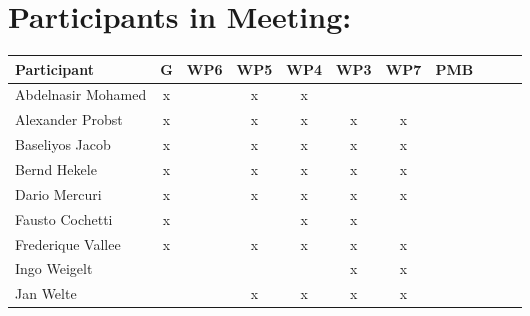 \documentclass[a4paper, 11pt]{article}
\begin{document}
\section{Participants in Meeting:}

\begin{tabular}{|l|c|c|c|c||c|c|c||c|c|c|}
\hline
\textbf{Participant}  & \textbf{G} & \textbf{WP6} &  \textbf{WP5} & \textbf{WP4}&  \textbf{WP3} & \textbf{WP7}&  \textbf{PMB} \\\hline
Abdelnasir Mohamed    & x &   & x & x  &  &  &  \\\hline 
Alexander Probst      & x &   & x & x & x & x &   \\\hline  
Baseliyos Jacob       & x &   & x & x & x & x &  \\\hline 
Bernd Hekele          & x &   & x & x & x & x &  \\\hline
Dario Mercuri        & x &   & x & x & x & x &   \\\hline
Fausto Cochetti      & x  &   &   & x & x &  &  \\\hline
Frederique Vallee      & x  &   &  x & x & x & x &  \\\hline
Ingo Weigelt         &   &   &  &  & x & x &   \\\hline
Jan Welte            &  &   & x & x & x & x &  \\\hline

\end{tabular}
\end{document}
